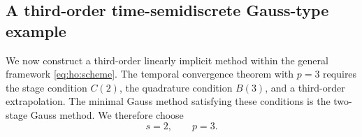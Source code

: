 \documentclass[11pt,a4paper]{article}
\newcommand{\pp}{\widetilde p}
\theoremstyle{definition}
\numberwithin{equation}{section}
\begin{document}

\subsection{A third-order time-semidiscrete Gauss-type example}
\label{subsec:ho:third-order-example}

We now construct a third-order linearly implicit method within the
general framework \eqref{eq:ho:scheme}. The temporal convergence
theorem with \(p=3\) requires the stage condition \(C(2)\), the
quadrature condition \(B(3)\), and a third-order extrapolation. The
minimal Gauss method satisfying these conditions is the two-stage
Gauss method. We therefore choose
\begin{equation}\label{eq:ho:order-three-parameters}
 s=2,\qquad p=3.
\end{equation}
\end{document}
